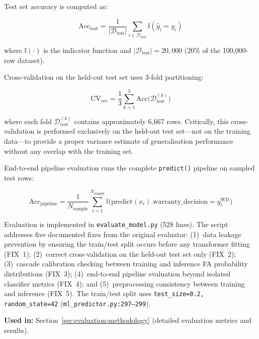 \documentclass[10pt,a4paper]{article}
\begin{document}
Test set accuracy is computed as:

\begin{equation}
\text{Acc}_{\text{test}} = \frac{1}{|\mathcal{D}_{\text{test}}|} \sum_{i \in \mathcal{D}_{\text{test}}} \mathbb{I}(\hat{y}_i = y_i)
\label{eq:test-accuracy}
\end{equation}

where $\mathbb{I}(\cdot)$ is the indicator function and $|\mathcal{D}_{\text{test}}| = 20{,}000$ (20\% of the 100{,}000-row dataset).

Cross-validation on the held-out test set uses 3-fold partitioning:

\begin{equation}
\text{CV}_{\text{acc}} = \frac{1}{3} \sum_{k=1}^{3} \text{Acc}\big(\mathcal{D}_{\text{test}}^{(k)}\big)
\label{eq:cv-accuracy}
\end{equation}

where each fold $\mathcal{D}_{\text{test}}^{(k)}$ contains approximately 6{,}667 rows. Critically, this cross-validation is performed exclusively on the held-out test set---not on the training data---to provide a proper variance estimate of generalisation performance without any overlap with the training set.

End-to-end pipeline evaluation runs the complete \texttt{predict()} pipeline on sampled test rows:

\begin{equation}
\text{Acc}_{\text{pipeline}} = \frac{1}{N_{\text{sample}}} \sum_{i=1}^{N_{\text{sample}}} \mathbb{I}\big(\text{predict}(x_i).\text{warranty\_decision} = y_i^{\text{WD}}\big)
\label{eq:pipeline-accuracy}
\end{equation}

Evaluation is implemented in \texttt{evaluate\_model.py} (528 lines). The script addresses five documented fixes from the original evaluator: (1)~data leakage prevention by ensuring the train/test split occurs before any transformer fitting (FIX~1); (2)~correct cross-validation on the held-out test set only (FIX~2); (3)~cascade calibration checking between training and inference FA probability distributions (FIX~3); (4)~end-to-end pipeline evaluation beyond isolated classifier metrics (FIX~4); and (5)~preprocessing consistency between training and inference (FIX~5). The train/test split uses \texttt{test\_size=0.2, random\_state=42} (\texttt{ml\_predictor.py:297--299}).

\textbf{Used in:} Section~\ref{sec:evaluation-methodology} (detailed evaluation metrics and results).
\end{document}
